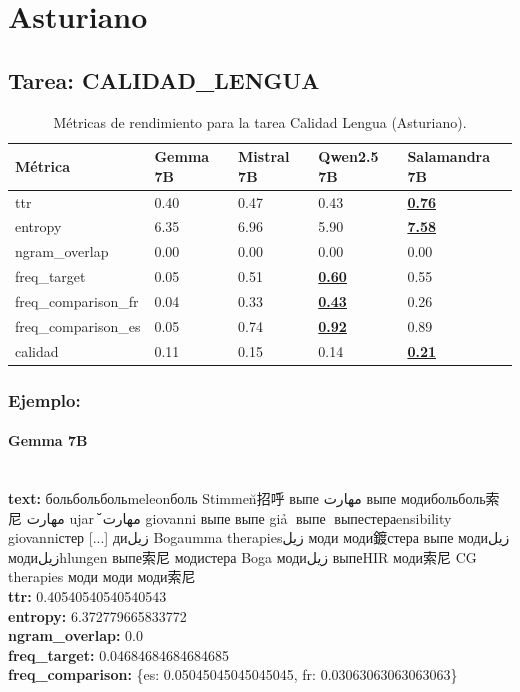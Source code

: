 \section{Asturiano}

\subsection{Tarea: CALIDAD\_LENGUA}\label{tarea-calidad_lengua}
\begin{longtable}[]{@{}lllll@{}}
\toprule\noalign{}
Métrica & Gemma 7B & Mistral 7B & Qwen2.5 7B & Salamandra 7B \\
\midrule\noalign{}
\endhead
\bottomrule\noalign{}
\caption{Métricas de rendimiento para la tarea Calidad Lengua (Asturiano).}
\label{tab:metricas_calidad_lengua_Asturiano}
\endlastfoot
ttr & 0.40 & 0.47 & 0.43 & \textbf{\underline{0.76}} \\
entropy & 6.35 & 6.96 & 5.90 & \textbf{\underline{7.58}} \\
ngram\_overlap & 0.00 & 0.00 & 0.00 & 0.00 \\
freq\_target & 0.05 & 0.51 & \textbf{\underline{0.60}} & 0.55 \\
freq\_comparison\_fr & 0.04 & 0.33 & \textbf{\underline{0.43}} & 0.26 \\
freq\_comparison\_es & 0.05 & 0.74 & \textbf{\underline{0.92}} & 0.89 \\
calidad & 0.11 & 0.15 & 0.14 & \textbf{\underline{0.21}} \\
\end{longtable}

\subsubsection{Ejemplo:}

\paragraph{Gemma 7B}~\\
\textbf{text:} больбольбольmeleonболь Stimmen̆招呼 выпе مهارت выпе модибольболь索尼 مهارت ujar🥈 مهارت̆ giovanni выпе выпе giả🥈 выпе🥈 выпестераensibility giovanniстер [...] диزيل Bogaumma therapiesزيل моди моди鍍стера выпе модиزيل модиزيلhlungen выпе索尼 модистера Boga модиزيل выпеHIR моди索尼 CG therapies моди моди моди索尼\\
\textbf{ttr:} 0.40540540540540543\\
\textbf{entropy:} 6.372779665833772\\
\textbf{ngram\_overlap:} 0.0\\
\textbf{freq\_target:} 0.04684684684684685\\
\textbf{freq\_comparison:} \{\textquotesingle{}es\textquotesingle{}: 0.05045045045045045, \textquotesingle{}fr\textquotesingle{}: 0.03063063063063063\}


